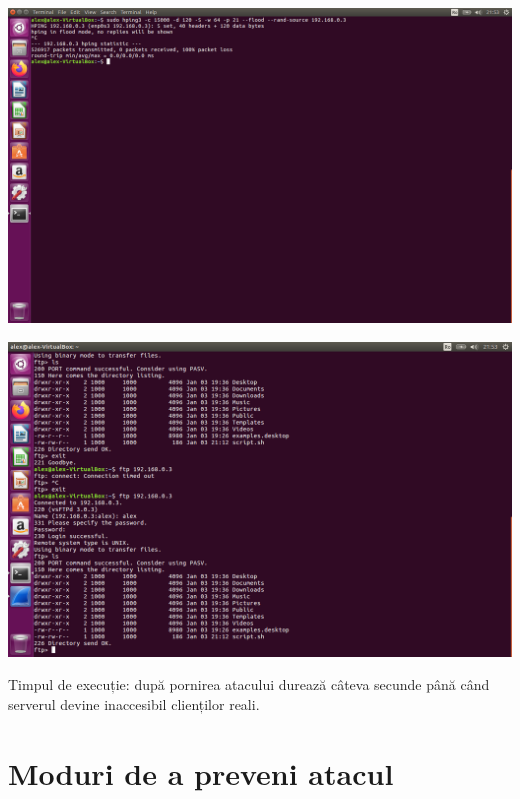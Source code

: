 \documentclass[a4paper]{article}
\begin{document}
\begin{enumerate}
    \begin{center}
        \hspace*{-1.8cm}                                          \includegraphics[scale=0.64]{"./img/pas7.png"}       
    \end{center}
    
    \begin{center}
        \hspace*{-1.8cm}                                          \includegraphics[scale=0.64]{"./img/pas8.png"}       
    \end{center}
    
\end{enumerate}

Timpul de execuție: după pornirea atacului durează câteva secunde până când serverul devine inaccesibil clienților reali.

\section{Moduri de a preveni atacul}
\end{document}
